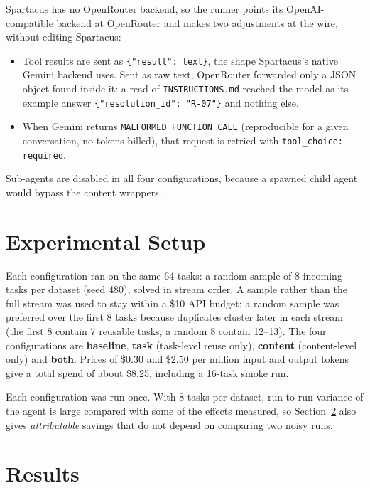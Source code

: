 \documentclass[11pt]{article}
\begin{document}
Spartacus has no OpenRouter backend, so the runner points its OpenAI-compatible backend at
OpenRouter and makes two adjustments at the wire, without editing Spartacus:
\begin{itemize}
  \item Tool results are sent as \texttt{\{"result": text\}}, the shape Spartacus's native
        Gemini backend uses. Sent as raw text, OpenRouter forwarded only a JSON object found
        inside it: a read of \texttt{INSTRUCTIONS.md} reached the model as its example answer
        \texttt{\{"resolution\_id": "R-07"\}} and nothing else.
  \item When Gemini returns \texttt{MALFORMED\_FUNCTION\_CALL} (reproducible for a given
        conversation, no tokens billed), that request is retried with
        \texttt{tool\_choice: required}.
\end{itemize}
Sub-agents are disabled in all four configurations, because a spawned child agent would
bypass the content wrappers.

\section{Experimental Setup}

Each configuration ran on the same 64 tasks: a random sample of 8 incoming tasks per dataset
(seed 480), solved in stream order. A sample rather than the full stream was used to stay
within a \$10 API budget; a random sample was preferred over the first 8 tasks because
duplicates cluster later in each stream (the first 8 contain 7 reusable tasks, a random 8
contain 12--13). The four configurations are \textbf{baseline}, \textbf{task} (task-level
reuse only), \textbf{content} (content-level only) and \textbf{both}. Prices of \$0.30 and
\$2.50 per million input and output tokens give a total spend of about \$8.25, including a
16-task smoke run.

Each configuration was run once. With 8 tasks per dataset, run-to-run variance of the agent
is large compared with some of the effects measured, so Section~\ref{sec:results} also gives
\emph{attributable} savings that do not depend on comparing two noisy runs.

\section{Results}\label{sec:results}
\end{document}

